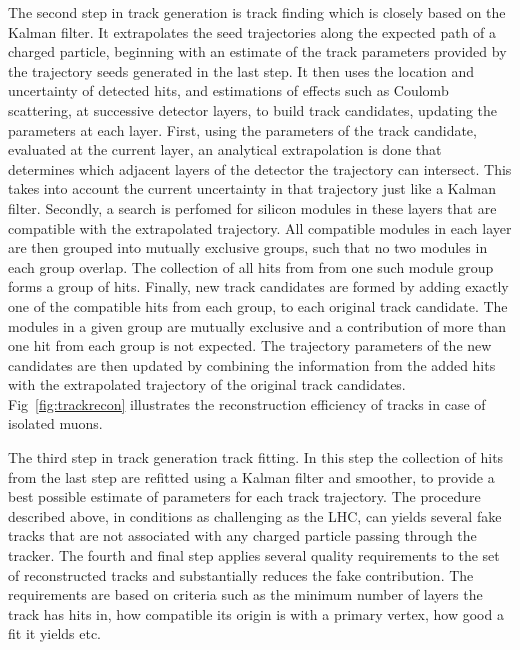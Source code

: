 The second step in track generation is track finding which is closely based on the Kalman filter. It extrapolates the seed trajectories along the expected path of a charged particle, beginning with an estimate of the track parameters provided by the trajectory seeds generated in the last step. It then uses the location and uncertainty of detected hits, and estimations of effects such as Coulomb scattering, at successive detector layers, to build track candidates, updating the parameters at each layer. First, using the parameters of the track candidate, evaluated at the current layer, an analytical extrapolation is done that determines which adjacent layers of the detector the trajectory can intersect. This takes into account the current uncertainty in that trajectory just like a Kalman filter. Secondly, a search is perfomed for silicon modules in these layers that are compatible with the extrapolated trajectory. All compatible modules in each layer are then grouped into mutually exclusive groups, such that no two modules in each group overlap. The collection of all hits from from one such module group forms a group of hits. Finally, new track candidates are formed by adding exactly one of the compatible hits from each group, to each original track candidate. The modules in a given group are mutually exclusive and a contribution of more than one hit from each group is not expected. The trajectory parameters of the new candidates are then updated by combining the information from the added hits with the extrapolated trajectory of the original track candidates. Fig~\ref{fig:trackrecon} illustrates the reconstruction efficiency of tracks in case of isolated muons.

The third step in track generation track fitting. In this step the collection of hits from the last step are refitted using a Kalman filter and smoother, to provide a best possible estimate of parameters for each track trajectory. The procedure described above, in conditions as challenging as the LHC, can yields several fake tracks that are not associated with any charged particle passing through the tracker. The fourth and final step applies several quality requirements to the set of reconstructed tracks and substantially reduces the fake contribution. The requirements are based on criteria such as the minimum number of layers the track has hits in, how compatible its origin is with a primary vertex, how good a fit it yields etc.

